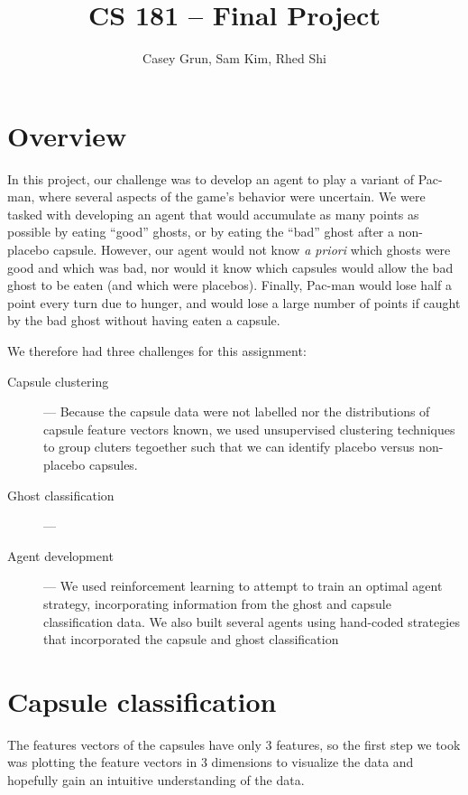 \documentclass[11pt]{amsart}
\title{CS 181 -- Final Project}
\author{Casey Grun, Sam Kim, Rhed Shi}
\begin{document}
\maketitle

\section{Overview}

In this project, our challenge was to develop an agent to play a variant of Pac-man, where several aspects of the game's behavior were uncertain. We were tasked with developing an agent that would accumulate as many points as possible by eating ``good'' ghosts, or by eating the ``bad'' ghost after a non-placebo capsule. However, our agent would not know \emph{a priori} which ghosts were good and which was bad, nor would it know which capsules would allow the bad ghost to be eaten (and which were placebos). Finally, Pac-man would lose half a point every turn due to hunger, and would lose a large number of points if caught by the bad ghost without having eaten a capsule.

We therefore had three challenges for this assignment:
\begin{description}
	\item[Capsule clustering] --- Because the capsule data were not labelled nor the distributions of capsule feature vectors known, we used unsupervised clustering techniques to group cluters tegoether such that we can identify placebo versus non-placebo capsules.
	\item[Ghost classification] --- 
	\item[Agent development] --- We used reinforcement learning to attempt to train an optimal agent strategy, incorporating information from the ghost and capsule classification data. We also built several agents using hand-coded strategies that incorporated the capsule and ghost classification 
\end{description}

\section{Capsule classification}

The features vectors of the capsules have only 3 features, so the first step we took was plotting the feature vectors in 3 dimensions to visualize the data and hopefully gain an intuitive understanding of the data.
\end{document}
